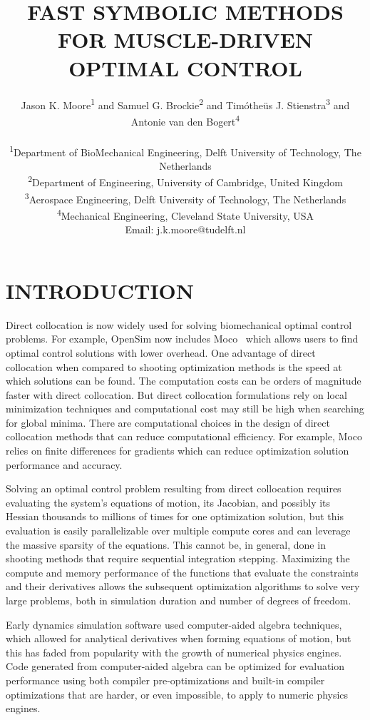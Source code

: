 \documentclass[11pt,twocolumn]{article}
\title{\normalsize\textbf{
  FAST SYMBOLIC METHODS FOR MUSCLE-DRIVEN OPTIMAL CONTROL
}}
\author{
Jason K. Moore\textsuperscript{1} and
Samuel G. Brockie\textsuperscript{2} and
Timótheüs J. Stienstra\textsuperscript{3} and
Antonie van den Bogert\textsuperscript{4}\\ \\
\textsuperscript{1}Department of BioMechanical Engineering, Delft University of Technology, The Netherlands\\
\textsuperscript{2}Department of Engineering, University of Cambridge, United Kingdom\\
\textsuperscript{3}Aerospace Engineering, Delft University of Technology, The Netherlands\\
\textsuperscript{4}Mechanical Engineering, Cleveland State University, USA\\
Email: j.k.moore@tudelft.nl}
\date{}
\begin{document}
\pagestyle{fancy}
\lhead{}
\fancyfoot{}
\maketitle
\section*{INTRODUCTION}
%
Direct collocation is now widely used for solving biomechanical optimal control
problems. For example, OpenSim now includes Moco~\cite{Dembia2019} which allows
users to find optimal control solutions with lower overhead. One advantage of
direct collocation when compared to shooting optimization methods is the speed
at which solutions can be found. The computation costs can be orders of
magnitude faster with direct collocation. But direct collocation formulations
rely on local minimization techniques and computational cost may still be high
when searching for global minima. There are computational choices in the design
of direct collocation methods that can reduce computational efficiency. For
example, Moco relies on finite differences for gradients which can reduce
optimization solution performance and accuracy.

Solving an optimal control problem resulting from direct collocation requires
evaluating the system's equations of motion, its Jacobian, and possibly its
Hessian thousands to millions of times for one optimization solution, but this
evaluation is easily parallelizable over multiple compute cores and can leverage
the massive sparsity of the equations. This cannot be, in general, done in
shooting methods that require sequential integration stepping. Maximizing the
compute and memory performance of the functions that evaluate the constraints
and their derivatives allows the subsequent optimization algorithms to solve
very large problems, both in simulation duration and number of degrees of
freedom.

Early dynamics simulation software used computer-aided algebra techniques, which
allowed for analytical derivatives when forming equations of motion, but this
has faded from popularity with the growth of numerical physics engines. Code
generated from computer-aided algebra can be optimized for evaluation
performance using both compiler pre-optimizations and built-in compiler
optimizations that are harder, or even impossible, to apply to numeric physics
engines.
\end{document}
